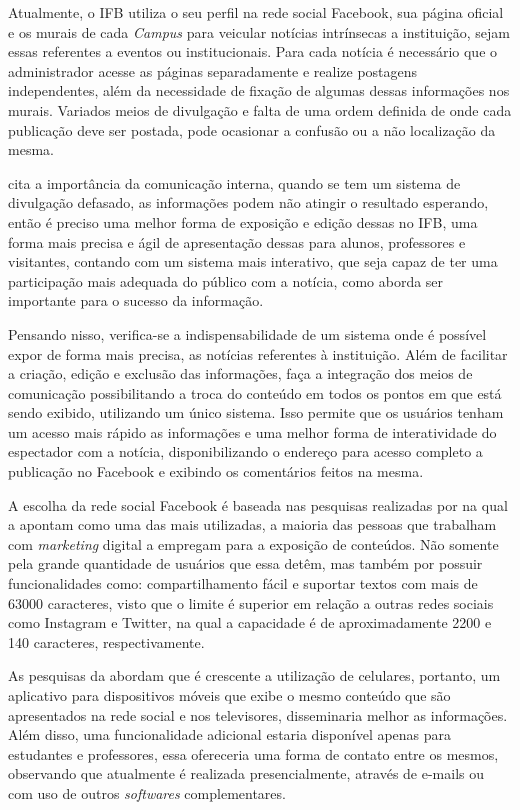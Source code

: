 Atualmente, o IFB utiliza o seu perfil na rede social Facebook, sua página oficial e os murais de cada \textit{Campus} para veicular notícias intrínsecas a instituição, sejam essas referentes a eventos ou institucionais. Para cada notícia é necessário que o administrador acesse as páginas separadamente e realize postagens independentes, além da necessidade de fixação de algumas dessas informações nos murais. Variados meios de divulgação e falta de uma ordem definida de onde cada publicação deve ser postada, pode ocasionar a confusão ou a não localização da mesma.

\citet{pinheiro2010} cita a importância da comunicação interna, quando se tem um sistema de divulgação defasado, as informações podem não atingir o resultado esperando, então é preciso uma melhor forma de exposição e edição dessas no IFB, uma forma mais precisa e ágil de apresentação dessas para alunos, professores e visitantes, contando com um sistema mais interativo, que seja capaz de ter uma participação mais adequada do público com a notícia, como \citet{santos2014} aborda ser importante para o sucesso da informação.

Pensando nisso, verifica-se a indispensabilidade de um sistema onde é possível expor de forma mais precisa, as notícias referentes à instituição. Além de facilitar a criação, edição e exclusão das informações, faça a integração dos meios de comunicação possibilitando a troca do conteúdo em todos os pontos em que está sendo exibido, utilizando um único sistema. Isso permite que os usuários tenham um acesso mais rápido as informações e uma melhor forma de interatividade do espectador com a notícia, disponibilizando o endereço para acesso completo a publicação no Facebook e exibindo os comentários feitos na mesma.

A escolha da rede social Facebook é baseada nas pesquisas realizadas por \citet{muchardie2016} na qual a apontam como uma das mais utilizadas, a maioria das pessoas que trabalham com \textit{marketing} digital a empregam para a exposição de conteúdos. Não somente pela grande quantidade de usuários que essa detêm, mas também por possuir funcionalidades como: compartilhamento fácil e suportar textos com mais de 63000 caracteres, visto que o limite é superior em relação a outras redes sociais como Instagram e Twitter, na qual a capacidade é de aproximadamente 2200 e 140 caracteres, respectivamente.

As pesquisas da \citet{emarketer} abordam que é crescente a utilização de celulares, portanto, um aplicativo para dispositivos móveis que exibe o mesmo conteúdo que são apresentados na rede social e nos televisores, disseminaria melhor as informações. Além disso, uma funcionalidade adicional estaria disponível apenas para estudantes e professores, essa ofereceria uma forma de contato entre os mesmos, observando que atualmente é realizada presencialmente, através de e-mails ou com uso de outros \textit{softwares} complementares.

